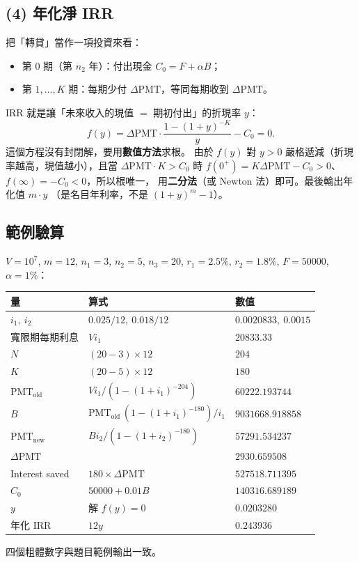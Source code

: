 \documentclass[11pt,a4paper]{article}
\begin{document}
\subsection{(4) 年化淨 IRR}

把「轉貸」當作一項投資來看：
\begin{itemize}
  \item 第 0 期（第 $n_2$ 年）：付出現金 $C_0=F+\alpha B$；
  \item 第 $1,\dots,K$ 期：每期少付 $\Delta\mathrm{PMT}$，等同每期收到 $\Delta\mathrm{PMT}$。
\end{itemize}
IRR 就是讓「未來收入的現值 $=$ 期初付出」的折現率 $y$：
\[
  f(y)=\Delta\mathrm{PMT}\cdot\frac{1-(1+y)^{-K}}{y}-C_0=0.
\]
這個方程沒有封閉解，要用\textbf{數值方法}求根。
由於 $f(y)$ 對 $y>0$ 嚴格遞減（折現率越高，現值越小），且當 $\Delta\mathrm{PMT}\cdot K>C_0$ 時
$f(0^+)=K\Delta\mathrm{PMT}-C_0>0$、$f(\infty)=-C_0<0$，所以根唯一，
用\textbf{二分法}（或 Newton 法）即可。最後輸出年化值 $m\cdot y$
（是名目年利率，不是 $(1+y)^m-1$）。

\subsection{範例驗算}

$V=10^7$, $m=12$, $n_1=3$, $n_2=5$, $n_3=20$, $r_1=2.5\%$, $r_2=1.8\%$, $F=50000$, $\alpha=1\%$：

\begin{center}
\begin{tabular}{lll}
\toprule
量 & 算式 & 數值\\
\midrule
$i_1,\ i_2$ & $0.025/12,\ 0.018/12$ & $0.0020833,\ 0.0015$\\
寬限期每期利息 & $V i_1$ & $20833.33$\\
$N$ & $(20-3)\times12$ & $204$\\
$K$ & $(20-5)\times12$ & $180$\\
$\mathrm{PMT}_{\text{old}}$ & $V i_1/(1-(1+i_1)^{-204})$ & $\mathbf{60222.193744}$\\
$B$ & $\mathrm{PMT}_{\text{old}}\,(1-(1+i_1)^{-180})/i_1$ & $\mathbf{9031668.918858}$\\
$\mathrm{PMT}_{\text{new}}$ & $B i_2/(1-(1+i_2)^{-180})$ & $57291.534237$\\
$\Delta\mathrm{PMT}$ & & $2930.659508$\\
Interest saved & $180\times\Delta\mathrm{PMT}$ & $\mathbf{527518.711395}$\\
$C_0$ & $50000+0.01B$ & $140316.689189$\\
$y$ & 解 $f(y)=0$ & $0.0203280$\\
年化 IRR & $12y$ & $\mathbf{0.243936}$\\
\bottomrule
\end{tabular}
\end{center}
四個粗體數字與題目範例輸出一致。
\end{document}
